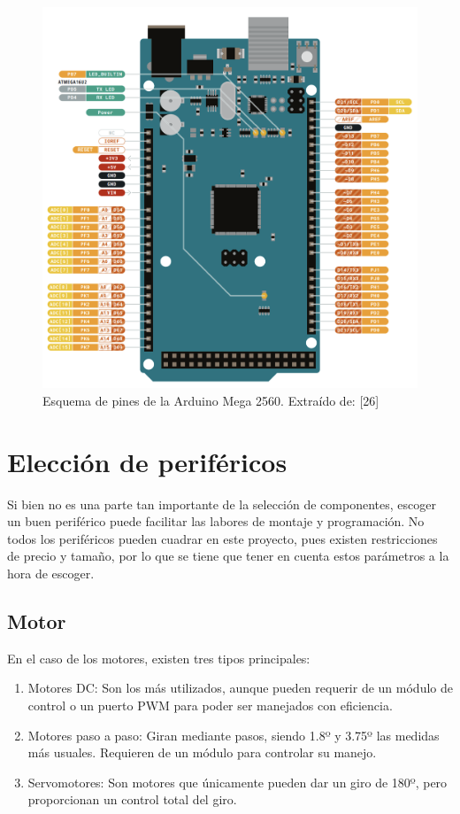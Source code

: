     \begin{figure}[H]
        \centering
        \includegraphics[width=1\textwidth]{imagenes/pinout_amega2560.png}
        \caption{Esquema de pines de la Arduino Mega 2560. Extraído de: [26]}
    \end{figure}
 

\section{Elección de periféricos}
 
Si bien no es una parte tan importante de la selección de componentes, escoger un buen periférico puede facilitar las labores de montaje y programación. No todos los periféricos pueden cuadrar en este proyecto, pues existen restricciones de precio y tamaño, por lo que se tiene que tener en cuenta estos parámetros a la hora de escoger. 



 \subsection*{Motor}

 En el caso de los motores, existen tres tipos principales: 

 \begin{enumerate}
  \item Motores DC: Son los más utilizados, aunque pueden requerir de un módulo de control o un puerto PWM para poder ser manejados con eficiencia.
  \item Motores paso a paso: Giran mediante pasos, siendo 1.8º y 3.75º las medidas más usuales. Requieren de un módulo para controlar su manejo.
  \item Servomotores: Son motores que únicamente pueden dar un giro de 180º, pero proporcionan un control total del giro.
 \end{enumerate}

